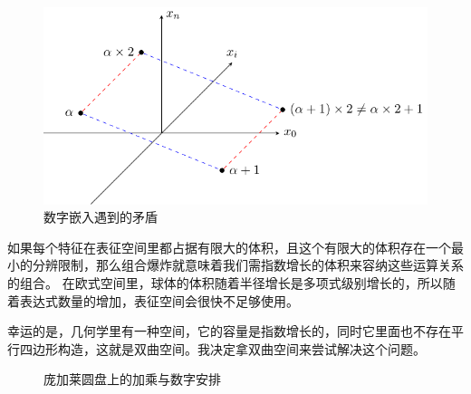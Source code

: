 \documentclass[a4paper,12pt]{book}
\numberwithin{problem}{section}
\numberwithin{definition}{section}
\numberwithin{lemma}{section}
\numberwithin{proposition}{section}
\numberwithin{theorem}{section}
\numberwithin{grammar}{section}
\numberwithin{program}{section}
\numberwithin{convention}{section}
\numberwithin{corollary}{section}
\begin{document}
\begin{figure}
\centering
\includegraphics{../images/numberembedding}
\caption{数字嵌入遇到的矛盾}
\end{figure}

如果每个特征在表征空间里都占据有限大的体积，且这个有限大的体积存在一个最小的分辨限制，那么组合爆炸就意味着我们需指数增长的体积来容纳这些运算关系的组合。
在欧式空间里，球体的体积随着半径增长是多项式级别增长的，所以随着表达式数量的增加，表征空间会很快不足够使用。

幸运的是，几何学里有一种空间，它的容量是指数增长的，同时它里面也不存在平行四边形构造，这就是双曲空间。我决定拿双曲空间来尝试解决这个问题。

\begin{figure}[ht]\centering
{}
\caption{庞加莱圆盘上的加乘与数字安排}\label{fig:assignment2}
\end{figure}
\end{document}
